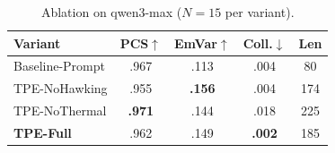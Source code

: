 \begin{table}[t]
\centering
\small
\begin{tabular}{lcccc}
\toprule
\textbf{Variant} & \textbf{PCS}$\uparrow$ & \textbf{EmVar}$\uparrow$ & \textbf{Coll.}$\downarrow$ & \textbf{Len} \\
\midrule
Baseline-Prompt & .967 & .113 & .004 & 80 \\
TPE-NoHawking & .955 & \textbf{.156} & .004 & 174 \\
TPE-NoThermal & \textbf{.971} & .144 & .018 & 225 \\
\textbf{TPE-Full} & .962 & .149 & \textbf{.002} & 185 \\
\bottomrule
\end{tabular}
\caption{Ablation on qwen3-max ($N{=}15$ per variant).}
\label{tab:ablation}
\end{table}
